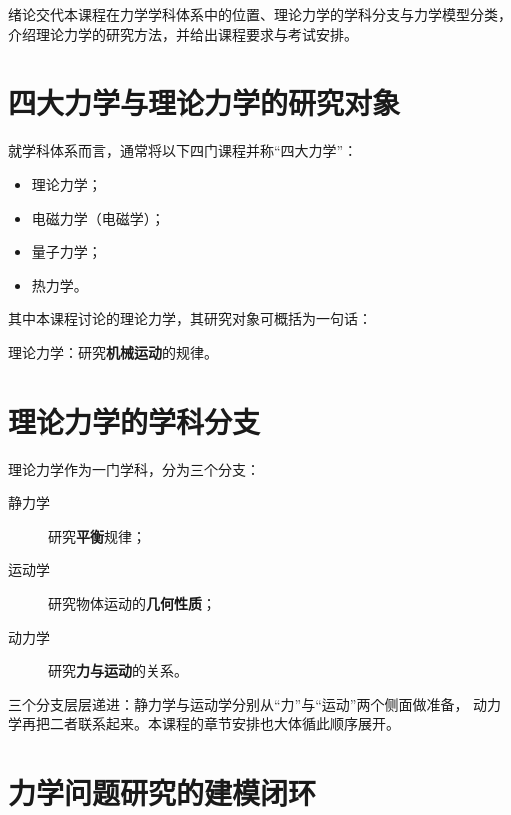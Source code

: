
绪论交代本课程在力学学科体系中的位置、理论力学的学科分支与力学模型分类，
介绍理论力学的研究方法，并给出课程要求与考试安排。

\section{四大力学与理论力学的研究对象}

就学科体系而言，通常将以下四门课程并称“四大力学”：
\begin{itemize}
  \item 理论力学；
  \item 电磁力学（电磁学）；
  \item 量子力学；
  \item 热力学。
\end{itemize}

其中本课程讨论的理论力学，其研究对象可概括为一句话：

\begin{keybox}[研究对象]
理论力学：研究\textbf{机械运动}的规律。
\end{keybox}

\section{理论力学的学科分支}

理论力学作为一门学科，分为三个分支：
\begin{description}
  \item[静力学] 研究\textbf{平衡}规律；
  \item[运动学] 研究物体运动的\textbf{几何性质}；
  \item[动力学] 研究\textbf{力与运动}的关系。
\end{description}

三个分支层层递进：静力学与运动学分别从“力”与“运动”两个侧面做准备，
动力学再把二者联系起来。本课程的章节安排也大体循此顺序展开。

\section{力学问题研究的建模闭环}

